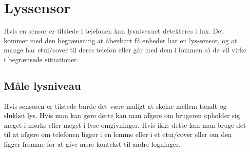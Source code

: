 \section{Lyssensor}
Hvis en sensor er tilstede i telefonen kan lysniveauet detekteres i lux. Det kommer med den begrænsning at åbenbart få enheder har en lys-sensor, og at mange har etui/cover til deres telefon eller går med dem i lommen så de vil virke i begrænsede situationer.

\subsection{Måle lysniveau}
Hvis sensoren er tilstede burde det være muligt at skelne mellem tændt og slukket lys. Hvis man kan gøre dette kan man afgøre om brugeren opholder sig meget i mørke eller meget i lyse omgivninger. Hvis ikke dette kan man bruge det til at afgøre om telefonen ligger i en lomme eller i et etui/cover eller om den ligger fremme for at give mere kontekst til andre logninger.

